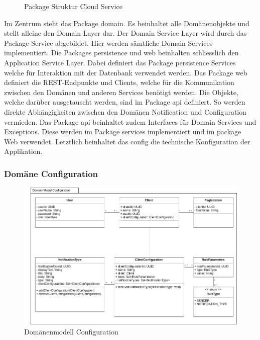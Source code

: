 \begin{figure}[h]
    \centering
    \begin{minipage}[b]{0.9\textwidth}

        \caption{Package Struktur Cloud Service}\label{fig:packagescloudservice}
    \end{minipage}
\end{figure}

Im Zentrum steht das Package domain.
Es beinhaltet alle Domänenobjekte und stellt alleine den Domain Layer dar.
Der Domain Service Layer wird durch das Package Service abgebildet.
Hier werden sämtliche Domain Services implementiert.
Die Packages persistence und web beinhalten schliesslich den Application Service Layer.
Dabei definiert das Package persistence Services welche für Interaktion mit der Datenbank verwendet werden.
Das Package web definiert die REST-Endpunkte und Clients, welche für die Kommunikation zwischen den Domänen und anderen Services benötigt werden.
Die Objekte, welche darüber ausgetauscht werden, sind im Package api definiert.
So werden direkte Abhängigkeiten zwischen den Domänen Notification und Configuration vermieden.
Das Package api beinhaltet zudem Interfaces für Domain Services und Exceptions.
Diese werden im Package services implementiert und im package Web verwendet.
Letztlich beinhaltet das config die technische Konfiguration der Applikation.

\clearpage

\subsubsection{Domäne Configuration}

\begin{figure}[h]
    \centering
    \begin{minipage}[b]{0.9\textwidth}
        \includegraphics[width=\textwidth]{graphics/Class_Configuration_Domain}
        \caption{Domänenmodell Configuration}
    \end{minipage}
\end{figure}

